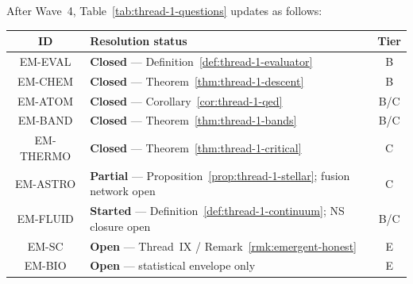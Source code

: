 \begin{remark}
\label{rmk:thread1-wave4-table}
After Wave~4, Table~\ref{tab:thread-1-questions} updates as follows:
\begin{center}
\small
\begin{tabular}{@{}clc@{}}
\toprule
\textbf{ID} & \textbf{Resolution status} & \textbf{Tier} \\
\midrule
EM-EVAL &
  \textbf{Closed} --- Definition~\ref{def:thread-1-evaluator} &
  B \\
EM-CHEM &
  \textbf{Closed} --- Theorem~\ref{thm:thread-1-descent} &
  B \\
EM-ATOM &
  \textbf{Closed} --- Corollary~\ref{cor:thread-1-qed} &
  B/C \\
EM-BAND &
  \textbf{Closed} --- Theorem~\ref{thm:thread-1-bands} &
  B/C \\
EM-THERMO &
  \textbf{Closed} --- Theorem~\ref{thm:thread-1-critical} &
  C \\
EM-ASTRO &
  \textbf{Partial} --- Proposition~\ref{prop:thread-1-stellar}; fusion network open &
  C \\
EM-FLUID &
  \textbf{Started} --- Definition~\ref{def:thread-1-continuum}; NS closure open &
  B/C \\
EM-SC &
  \textbf{Open} --- Thread~IX / Remark~\ref{rmk:emergent-honest} &
  E \\
EM-BIO &
  \textbf{Open} --- statistical envelope only &
  E \\
\bottomrule
\end{tabular}
\end{center}
\end{remark}